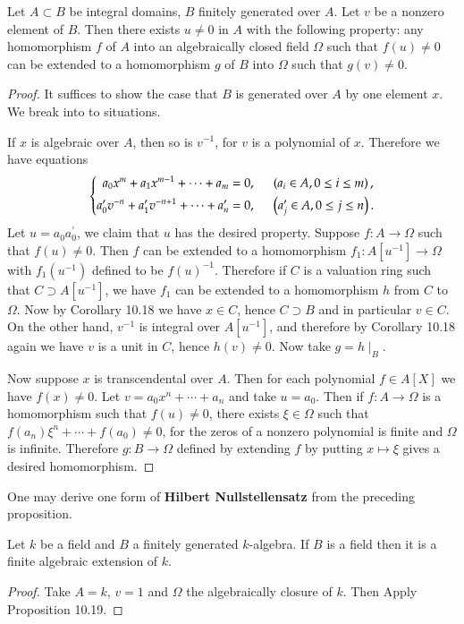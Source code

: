 \begin{proposition}
Let $A\subset B$ be integral domains, $B$ finitely generated over $A$. Let $v$ be a nonzero element of $B$. Then there exists $u\ne 0$ in $A$ with the following property: any homomorphism $f$ of $A$ into an algebraically closed field $\Omega$ such that $f(u)\ne 0$ can be extended to a homomorphism $g$ of $B$ into $\Omega$ such that $g(v)\ne 0$.
\end{proposition}
\begin{proof}
It suffices to show the case that $B$ is generated over $A$ by one element $x$. We break into to situations.\par
If $x$ is algebraic over $A$, then so is $v^{-1}$, for $v$ is a polynomial of $x$. Therefore we have equations 
$$
\left\{ \begin{aligned}
	a_0x^m+a_1x^{m-1}+\cdots +a_m&=0,\hspace{0.5cm}\left( a_i\in A,0\le i\le m \right) ,\\
	a_{0}^{\prime}v^{-n}+a_{1}^{\prime}v^{-n+1}+\cdots +a_{n}^{\prime}&=0,\hspace{0.5cm}\left( a_{j}^{\prime}\in A,0\le j\le n \right) .\\
\end{aligned} \right. 
$$
Let $u=a_0a_0^\prime$, we claim that $u$ has the desired property. Suppose $f:A\to\Omega$ such that $f(u)\ne 0$. Then $f$ can be extended to a homomorphism $f_1:A[u^{-1}]\to\Omega$ with $f_1(u^{-1})$ defined to be $f(u)^{-1}$. Therefore if $C$ is a valuation ring such that $C\supset A[u^{-1}]$, we have $f_1$ can be extended to a homomorphism $h$ from $C$ to $\Omega$. Now by Corollary 10.18 we have $x\in C$, hence $C\supset B$ and in particular $v\in C$. On the other hand, $v^{-1}$ is integral over $A[u^{-1}]$, and therefore by Corollary 10.18 again we have $v$ is a unit in $C$, hence $h(v)\ne 0$. Now take $g=h\mid_B$.\par
Now suppose $x$ is transcendental over $A$. Then for each polynomial $f\in A[X]$ we have $f(x)\ne 0$. Let $v=a_0x^n+\cdots+a_n$ and take $u=a_0$. Then if $f:A\to\Omega$ is a homomorphism such that $f(u)\ne 0$, there exists $\xi\in\Omega$ such that $f(a_n)\xi^n+\cdots+f(a_0)\ne 0$, for the zeros of a nonzero polynomial is finite and $\Omega$ is infinite. Therefore $g:B\to\Omega$ defined by extending $f$ by putting $x\mapsto\xi$ gives a desired homomorphism. 
\end{proof}
One may derive one form of \textbf{Hilbert Nullstellensatz} from the preceding proposition.
\begin{corollary}
Let $k$ be a field and $B$ a finitely generated $k$-algebra. If $B$ is a field then it is a finite algebraic extension of $k$.
\end{corollary}
\begin{proof}
Take $A=k$, $v=1$ and $\Omega$ the algebraically closure of $k$. Then Apply Proposition 10.19.
\end{proof}
